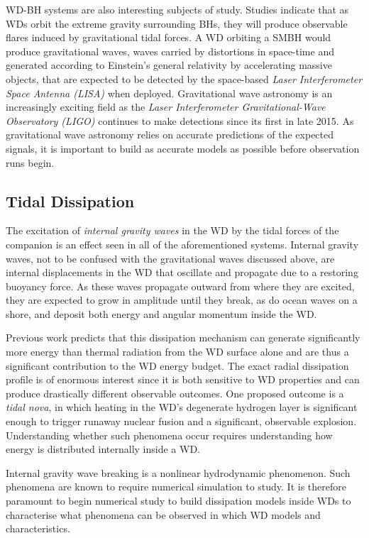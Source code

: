 \documentclass[11pt,
        usenames, %
        dvipsnames %
    ]{article}
\begin{document}
WD-BH systems are also interesting subjects of study. Studies indicate that
as WDs orbit the extreme gravity surrounding BHs, they will produce observable
flares induced by gravitational tidal forces\cite{flares}. A WD orbiting a SMBH
would produce gravitational waves, waves carried by distortions in space-time
and generated according to Einstein's general relativity by accelerating massive
objects, that are expected to be detected by the space-based \emph{Laser
Interferometer Space Antenna (LISA)} when deployed\cite{lisa}. Gravitational
wave astronomy is an increasingly exciting field as the \emph{Laser
Interferometer Gravitational-Wave Observatory (LIGO)} continues to make
detections since its first in late 2015. As gravitational wave astronomy relies
on accurate predictions of the expected signals, it is important to build as
accurate models as possible before observation runs begin.

\subsection{Tidal Dissipation}

The excitation of \emph{internal gravity waves} in the WD by the tidal forces of
the companion is an effect seen in all of the aforementioned systems. Internal
gravity waves, not to be confused with the gravitational waves discussed above,
are internal displacements in the WD that oscillate and propagate due to a
restoring buoyancy force. As these waves propagate outward from where they are
excited, they are expected to grow in amplitude until they break, as do ocean
waves on a shore, and deposit both energy and angular momentum inside the WD\@.

Previous work predicts that this dissipation mechanism can generate
significantly more energy than thermal radiation from the WD surface alone and
are thus a significant contribution to the WD energy budget\cite{fullerII}. The
exact radial dissipation profile is of enormous interest since it is both
sensitive to WD properties and can produce drastically different observable
outcomes. One proposed outcome is a \emph{tidal nova}, in which heating in the
WD's degenerate hydrogen layer is significant enough to trigger runaway nuclear
fusion and a significant, observable explosion\cite{tidal_novae}. Understanding
whether such phenomena occur requires understanding how energy is distributed
internally inside a WD\@.

Internal gravity wave breaking is a nonlinear hydrodynamic phenomenon. Such
phenomena are known to require numerical simulation to study. It is therefore
paramount to begin numerical study to build dissipation models inside WDs to
characterise what phenomena can be observed in which WD models and
characteristics.
\end{document}
